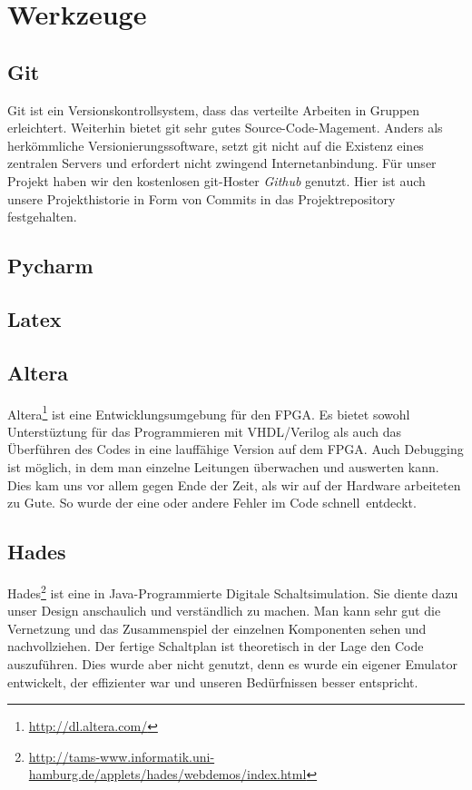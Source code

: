 \section{Werkzeuge}
\subsection{Git}
Git ist ein Versionskontrollsystem, dass das verteilte Arbeiten in Gruppen erleichtert. Weiterhin bietet git sehr gutes Source-Code-Magement. Anders als herkömmliche Versionierungssoftware, setzt git nicht auf die Existenz eines zentralen Servers und erfordert nicht zwingend Internetanbindung.
Für unser Projekt haben wir den kostenlosen git-Hoster \textit{Github} genutzt. Hier ist auch unsere Projekthistorie in Form von Commits in das Projektrepository festgehalten.

\subsection{Pycharm}

\subsection{Latex}

\subsection{Altera}
Altera\footnote{\url{http://dl.altera.com/}} ist eine Entwicklungsumgebung für den FPGA. Es bietet sowohl Unterstüztung für das Programmieren mit VHDL/Verilog als auch das Überführen des Codes in eine lauffähige Version auf dem FPGA. Auch Debugging ist möglich, in dem man einzelne Leitungen überwachen und auswerten kann. Dies kam uns vor allem gegen Ende der Zeit, als wir auf der Hardware arbeiteten zu Gute. So wurde der eine oder andere Fehler im Code \glqq schnell\grqq \ entdeckt. 

\subsection{Hades}
Hades\footnote{\url{http://tams-www.informatik.uni-hamburg.de/applets/hades/webdemos/index.html}} ist eine in Java-Programmierte Digitale Schaltsimulation. Sie diente dazu unser Design anschaulich und verständlich zu machen. Man kann sehr gut die Vernetzung und das Zusammenspiel der einzelnen Komponenten sehen und nachvollziehen. Der fertige Schaltplan ist theoretisch in der Lage den Code auszuführen. Dies wurde aber nicht genutzt, denn es wurde ein eigener Emulator entwickelt, der effizienter war und unseren Bedürfnissen besser entspricht.

